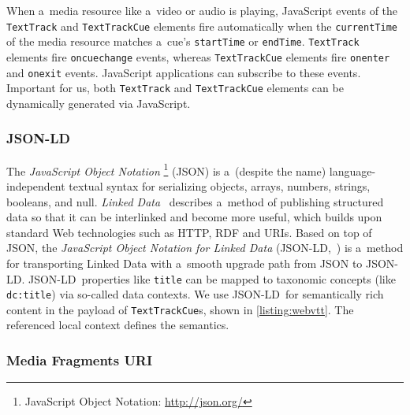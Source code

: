 \documentclass[runningheads,a4paper]{llncs}
\newcommand{\inlinelistingsize}{\fontsize{8pt}{11pt}}
\let\oldurl\url
\renewcommand{\url}[1]{\inlinelistingsize\oldurl{#1}}
\def\JSONLD{\mbox{JSON-LD}}
\def\JSONLD{\mbox{JSON-LD}}
\begin{document}
When a~media resource like a~video or audio is playing,
JavaScript events of the \texttt{TextTrack} and \texttt{TextTrackCue}
elements fire automatically when the \texttt{currentTime}
of the media resource matches
a~cue's \texttt{startTime} or \texttt{endTime}.
\texttt{TextTrack} elements fire \texttt{oncuechange} events,
whereas \texttt{TextTrackCue} elements fire
\texttt{onenter} and \texttt{onexit} events.
JavaScript applications can subscribe to these events.
Important for us, both \texttt{TextTrack} and
\texttt{TextTrackCue} elements
can be dynamically generated via JavaScript.

\subsubsection{\JSONLD}

The \emph{JavaScript Object Notation}%
\footnote{JavaScript Object Notation: \url{http://json.org/}}
(JSON)
is a~(despite the name) language-independent textual syntax
for serializing objects, arrays, numbers, strings, booleans, and null.
\emph{Linked Data}~\cite{bizer2009linkeddata}
describes a~method of publishing structured data
so that it can be interlinked and become more useful,
which builds upon standard Web technologies such as HTTP, RDF and URIs.
Based on top of JSON, the
\emph{JavaScript Object Notation for Linked Data}
(\JSONLD,~\cite{sporny2013jsonld}) is a~method for transporting
Linked Data with a~smooth upgrade path from JSON to \JSONLD.
\JSONLD~properties like \texttt{title} can be mapped to taxonomic
concepts (like \texttt{dc:title}) via so-called data contexts.
We use \JSONLD\ for semantically rich content
in the payload of \texttt{TextTrackCue}s, shown in
\autoref{listing:webvtt}.
The referenced local context defines the semantics.

\subsubsection{Media Fragments URI}
\end{document}

